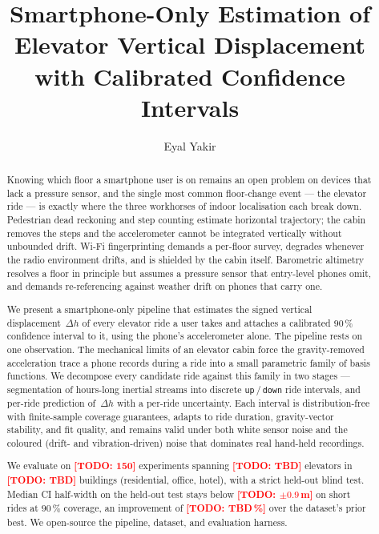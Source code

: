 \documentclass[manuscript,review,screen]{acmart}
\newcommand{\todo}[1]{\textcolor{red}{\textbf{[TODO: #1]}}}
\begin{document}
\title{Smartphone-Only Estimation of Elevator Vertical Displacement
       with Calibrated Confidence Intervals}

\author{Eyal Yakir}

\renewcommand{\shortauthors}{Yakir et al.}

\begin{abstract}
  Knowing which floor a smartphone user is on remains an open problem
  on devices that lack a pressure sensor, and the single most common
  floor-change event --- the elevator ride --- is exactly where the
  three workhorses of indoor localisation each break down.
  Pedestrian dead reckoning and step counting estimate horizontal
  trajectory; the cabin removes the steps and the accelerometer
  cannot be integrated vertically without unbounded drift.  Wi-Fi
  fingerprinting demands a per-floor survey, degrades whenever the
  radio environment drifts, and is shielded by the cabin itself.
  Barometric altimetry resolves a floor in principle but assumes a
  pressure sensor that entry-level phones omit, and demands
  re-referencing against weather drift on phones that carry one.

  We present a smartphone-only pipeline that estimates the signed
  vertical displacement~$\Delta h$ of every elevator ride a user
  takes and attaches a calibrated $90\,\%$ confidence interval to
  it, using the phone's accelerometer alone.  The pipeline rests on
  one observation.  The mechanical limits of an elevator cabin force
  the gravity-removed acceleration trace a phone records during a
  ride into a small parametric family of basis functions.  We
  decompose every candidate ride against this family in two stages
  --- segmentation of hours-long inertial streams into discrete
  \texttt{up}\,/\,\texttt{down} ride intervals, and per-ride
  prediction of~$\Delta h$ with a per-ride uncertainty.  Each
  interval is distribution-free with finite-sample coverage
  guarantees, adapts to ride duration, gravity-vector stability, and
  fit quality, and remains valid under both white sensor noise and
  the coloured (drift- and vibration-driven) noise that dominates
  real hand-held recordings.

  We evaluate on \todo{150} experiments spanning \todo{TBD} elevators
  in \todo{TBD} buildings (residential, office, hotel), with a strict
  held-out blind test.  Median CI half-width on the held-out test
  stays below \todo{$\pm 0.9$\,m} on short rides at $90\,\%$
  coverage, an improvement of \todo{TBD\,\%} over the dataset's prior
  best.  We open-source the pipeline, dataset, and evaluation
  harness.
\end{abstract}
\end{document}
